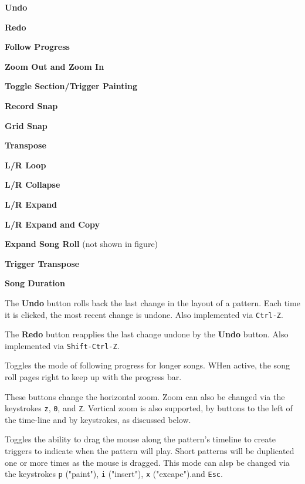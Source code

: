    \begin{enumber}
      \item \textbf{Undo}
      \item \textbf{Redo}
      \item \textbf{Follow Progress}
      \item \textbf{Zoom Out and Zoom In}
      \item \textbf{Toggle Section/Trigger Painting}
      \item \textbf{Record Snap}
      \item \textbf{Grid Snap}
      \item \textbf{Transpose}
      \item \textbf{L/R Loop}
      \item \textbf{L/R Collapse}
      \item \textbf{L/R Expand}
      \item \textbf{L/R Expand and Copy}
      \item \textbf{Expand Song Roll} (not shown in figure)
      \item \textbf{Trigger Transpose}
      \item \textbf{Song Duration}
   \end{enumber}

   \setcounter{ItemCounter}{0}      %

   The \textbf{Undo} button rolls back the last change in the layout of a
   pattern.  Each time it is clicked, the most recent change is undone.
   Also implemented via \texttt{Ctrl-Z}.

   The \textbf{Redo} button reapplies the last change undone by
   the \textbf{Undo} button.
   Also implemented via \texttt{Shift-Ctrl-Z}.

   Toggles the mode of following progress
   for longer songs.  WHen active, the song roll pages right to keep up with
   the progress bar.

   These buttons change the horizontal zoom.
   Zoom can also be changed via the keystrokes \texttt{z}, \texttt{0},
   and \texttt{Z}.
   Vertical zoom is also supported, by buttons to the left of the time-line and
   by keystrokes, as discussed below.

   Toggles the ability
   to drag the mouse along the pattern's timeline to create triggers
   to indicate when the pattern will play.
   Short patterns will be duplicated one or more times as
   the mouse is dragged.
   This mode can alsp be changed via the keystrokes \texttt{p} ("paint"),
   \texttt{i} ("insert"), \texttt{x} ("excape").and \texttt{Esc}.

